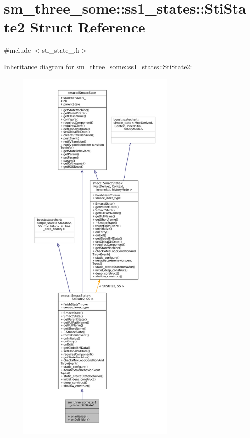 \hypertarget{structsm__three__some_1_1ss1__states_1_1StiState2}{}\section{sm\+\_\+three\+\_\+some\+:\+:ss1\+\_\+states\+:\+:Sti\+State2 Struct Reference}
\label{structsm__three__some_1_1ss1__states_1_1StiState2}


{\ttfamily \#include $<$sti\+\_\+state\+\_.\+h$>$}



Inheritance diagram for sm\+\_\+three\+\_\+some\+:\+:ss1\+\_\+states\+:\+:Sti\+State2\+:
\nopagebreak
\begin{figure}[H]
\begin{center}
\leavevmode
\includegraphics[height=550pt]{structsm__three__some_1_1ss1__states_1_1StiState2__inherit__graph}
\end{center}
\end{figure}


